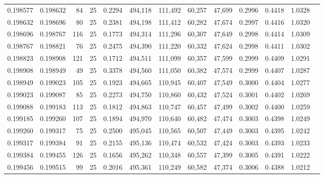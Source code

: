 \begin{tabular}{rrrrrrrrrrrrr}
0.198577 & 0.198632 &    84 &  25 &                                     0.2294 & 494,118 & 111,492 &  60,257 &  47,699 & 0.2996 & 0.4418 & 1.0328 \\
0.198632 & 0.198696 &    80 &  25 &                                     0.2381 & 494,198 & 111,412 &  60,282 &  47,674 & 0.2997 & 0.4416 & 1.0320 \\
0.198696 & 0.198767 &   116 &  25 &                                     0.1773 & 494,314 & 111,296 &  60,307 &  47,649 & 0.2998 & 0.4414 & 1.0309 \\
0.198767 & 0.198821 &    76 &  25 &                                     0.2475 & 494,390 & 111,220 &  60,332 &  47,624 & 0.2998 & 0.4411 & 1.0302 \\
0.198823 & 0.198908 &   121 &  25 &                                     0.1712 & 494,511 & 111,099 &  60,357 &  47,599 & 0.2999 & 0.4409 & 1.0291 \\
0.198908 & 0.198949 &    49 &  25 &                                     0.3378 & 494,560 & 111,050 &  60,382 &  47,574 & 0.2999 & 0.4407 & 1.0287 \\
0.198949 & 0.199023 &   105 &  25 &                                     0.1923 & 494,665 & 110,945 &  60,407 &  47,549 & 0.3000 & 0.4404 & 1.0277 \\
0.199023 & 0.199087 &    85 &  25 &                                     0.2273 & 494,750 & 110,860 &  60,432 &  47,524 & 0.3001 & 0.4402 & 1.0269 \\
0.199088 & 0.199183 &   113 &  25 &                                     0.1812 & 494,863 & 110,747 &  60,457 &  47,499 & 0.3002 & 0.4400 & 1.0259 \\
0.199185 & 0.199260 &   107 &  25 &                                     0.1894 & 494,970 & 110,640 &  60,482 &  47,474 & 0.3003 & 0.4398 & 1.0249 \\
0.199260 & 0.199317 &    75 &  25 &                                     0.2500 & 495,045 & 110,565 &  60,507 &  47,449 & 0.3003 & 0.4395 & 1.0242 \\
0.199317 & 0.199384 &    91 &  25 &                                     0.2155 & 495,136 & 110,474 &  60,532 &  47,424 & 0.3003 & 0.4393 & 1.0233 \\
0.199384 & 0.199455 &   126 &  25 &                                     0.1656 & 495,262 & 110,348 &  60,557 &  47,399 & 0.3005 & 0.4391 & 1.0222 \\
0.199456 & 0.199515 &    99 &  25 &                                     0.2016 & 495,361 & 110,249 &  60,582 &  47,374 & 0.3006 & 0.4388 & 1.0212 \\

\end{tabular}
